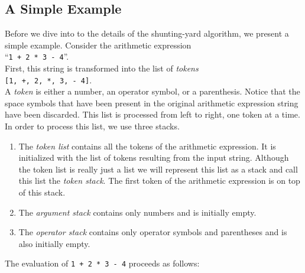 \subsection{A Simple Example}
Before we dive into to the details of the shunting-yard algorithm, we present a
simple example.  Consider the arithmetic expression 
\\[0.2cm]
\hspace*{1.3cm} 
``\texttt{1 + 2 * 3 - 4}''. 
\\[0.2cm]
First, this string is transformed into the list of \emph{tokens}
\\[0.2cm]
\hspace*{1.3cm}
\texttt{[1, +, 2, *, 3, - 4]}.
\\[0.2cm]
A \emph{token} is either a number, an operator symbol, or a parenthesis.
Notice that the space symbols that have been present in the original arithmetic expression string
have been discarded.  This list is processed from left to right, one token
 at a time.  In order to process this list, we use three stacks.
\begin{enumerate}
\item The  \emph{token list} contains all the tokens of the arithmetic expression.  It is
      initialized with the list of tokens resulting from the input string.
      Although the token list is really just a list we will represent this list as a stack and call
      this list the \emph{token stack}.
      The first token of the arithmetic expression is on top of this stack.
\item The  \emph{argument stack} contains only numbers and is initially empty.
\item The \emph{operator stack} contains only operator symbols and parentheses and is also initially
      empty.
\end{enumerate}
The evaluation of \texttt{1 + 2 * 3 - 4} proceeds as follows:
